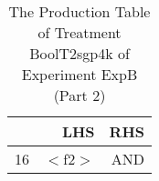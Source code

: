 \begin{table}[ht]
\centering
\begin{tabular}{rrr}
  \hline
 & LHS & RHS \\ 
  \hline
16 & $<$f2$>$ & AND \\ 
   \hline
\end{tabular}
\caption{The Production Table of Treatment BoolT2sgp4k of Experiment ExpB (Part 2)} 
\end{table}
